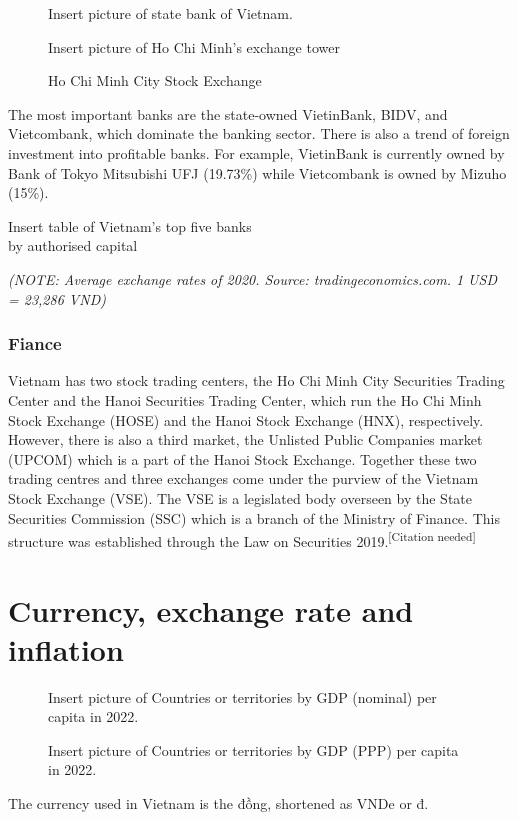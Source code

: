 \documentclass{article}
\begin{document}
\begin{figure}
    \begin{framed}
    Insert picture of state bank of Vietnam.
    \caption*{State Bank of Vietnam in Ho Chi Minh City (Saigon)}
    \end{framed}
    
    \begin{framed}
    Insert picture of Ho Chi Minh's exchange tower
    \caption*{Ho Chi Minh City Stock Exchange}
    \end{framed}
    \vspace{-50pt}
\end{figure}
The most important banks are the state-owned VietinBank, BIDV, and Vietcombank, which dominate the banking sector. There is also a trend of foreign investment into profitable banks. For example, VietinBank is currently owned by Bank of Tokyo Mitsubishi UFJ (19.73\%) while Vietcombank is owned by Mizuho (15\%).

\begin{table}[h]
    Insert table of Vietnam's top five banks\\by authorised capital
\end{table}
\textit{(NOTE: Average exchange rates of 2020. Source: tradingeconomics.com. 1 USD = 23,286 VND)}

\subsubsection*{Fiance}
Vietnam has two stock trading centers, the Ho Chi Minh City Securities Trading Center and the Hanoi Securities Trading Center, which run the Ho Chi Minh Stock Exchange (HOSE) and the Hanoi Stock Exchange (HNX), respectively. However, there is also a third market, the Unlisted Public Companies market (UPCOM) which is a part of the Hanoi Stock Exchange. Together these two trading centres and three exchanges come under the purview of the Vietnam Stock Exchange (VSE). The VSE is a legislated body overseen by the State Securities Commission (SSC) which is a branch of the Ministry of Finance. This structure was established through the Law on Securities 2019.\textsuperscript{[Citation needed]}

\section*{Currency, exchange rate and inflation}

\begin{figure}
    \begin{framed}
    Insert picture of Countries or territories by GDP (nominal) per capita in 2022.
    \end{framed}
    
    \begin{framed}
    Insert picture of Countries or territories by GDP (PPP) per capita in 2022.
    \end{framed}
    \vspace{-30pt}
\end{figure}
The currency used in Vietnam is the đồng, shortened as VNDe or đ.
\end{document}
